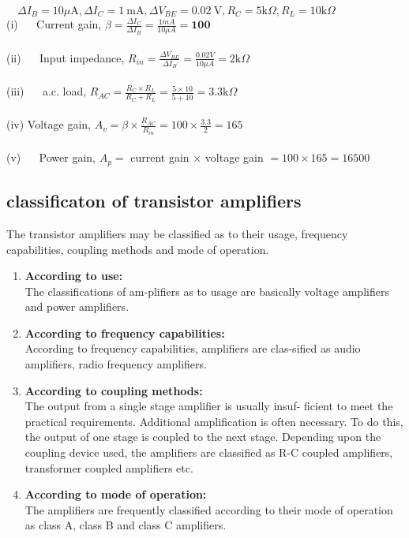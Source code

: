 \begin{answer}
 $\quad \Delta I_{B}=10 \mu \mathrm{A}, \Delta I_{C}=1 \mathrm{~mA}, \Delta V_{B E}=0.02 \mathrm{~V}, R_{C}=5 \mathrm{k} \Omega, R_{L}=10 \mathrm{k} \Omega$\\
	(i) $\quad$ Current gain, $\beta=\frac{\Delta I_{C}}{\Delta I_{B}}=\frac{1 m A}{10 \mu A}=\mathbf{1 0 0}$\\\\
	(ii) $\quad$ Input impedance, $R_{i n}=\frac{\Delta V_{B E}}{\Delta I_{B}}=\frac{0.02 V}{10 \mu A}=2 \mathrm{k} \Omega$\\\\
	(iii) $\quad$ a.c. load, $R_{A C}=\frac{R_{C} \times R_{L}}{R_{C}+R_{L}}=\frac{5 \times 10}{5+10}=3.3 \mathrm{k} \Omega$\\\\
	(iv) Voltage gain, $A_{v}=\beta \times \frac{R_{A C}}{R_{i n}}=100 \times \frac{3.3}{2}=165$\\\\
	(v) $\quad$ Power gain, $A_{p}=$ current gain $\times$ voltage gain $=100 \times 165=16500$
\end{answer}
\subsection{classificaton of transistor amplifiers}
\par The transistor amplifiers may be classified as to their usage, frequency capabilities, coupling methods and mode of operation.
\begin{enumerate}
	\item \textbf{According to use:}\\
	The classifications of am-plifiers as to usage are basically voltage amplifiers and
	power amplifiers.
	\item \textbf{According to frequency capabilities:}\\
	According to frequency capabilities, amplifiers are clas-sified as audio amplifiers, radio frequency amplifiers.
	\item \textbf{According to coupling methods:}\\
	The output from a single stage amplifier is usually insuf-
	ficient to meet the practical requirements. Additional amplification is often necessary. To do this, the output of one stage is coupled to the next stage. Depending upon the coupling device used, the amplifiers are classified as R-C coupled amplifiers, transformer coupled amplifiers etc.
	\item \textbf{According to mode of operation:}\\
	The amplifiers are frequently classified according to their mode of operation as class A, class B and class C amplifiers.
\end{enumerate}



